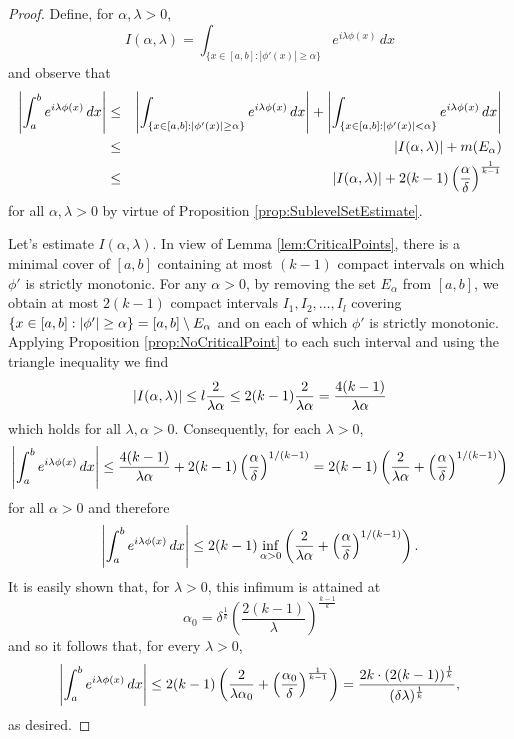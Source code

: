 \documentclass[11pt]{article}
\newcommand{\lp}{\left(}
\newcommand{\rp}{\right)}
\newcommand{\f}[2]{\frac{#1}{#2}}
\newcommand{\al}{\alpha}
\begin{document}
\begin{proof}
Define, for $\alpha,\lambda>0$,
\begin{equation*}
    I(\alpha,\lambda)=\int_{\{x\in[a,b]:|\phi'(x)|\geq \alpha\}}e^{i\lambda\phi(x)}\,dx
\end{equation*}
and observe that
\begin{eqnarray*}
    \abs{\int_a^b e^{i\lambda \phi(x)} \,dx}
    &\leq&  \abs{\int_{\{x\in[a,b]:|\phi'(x)|\geq \alpha\}}e^{i\lambda\phi(x)}\,dx}
    + 
    \abs{\int_{\{ x\in [a,b]: \abs{\phi'(x)} < \al \}}e^{i\lambda \phi(x)} \,dx } \\
    &\leq& \abs{I(\alpha,\lambda)}  + m(E_\al)\\
    &\leq& \abs{I(\alpha,\lambda)} + 2(k-1)\lp\f{\al}{\delta}\rp^{\f{1}{k-1}}
\end{eqnarray*}
for all $\alpha,\lambda>0$ by virtue of Proposition \ref{prop:SublevelSetEstimate}. 

Let's estimate $I(\al,\lambda)$. In view of Lemma \ref{lem:CriticalPoints}, there is a minimal cover of $[a,b]$ containing at most $(k-1)$ compact intervals on which $\phi'$ is strictly monotonic. For any $\alpha>0$, by removing the set $E_\alpha$ from $[a,b]$, we obtain at most $2(k-1)$ compact intervals $I_1,I_2,\dots,I_l$ covering $\{ x\in [a,b] : \abs{\phi'} \geq\alpha \}=[a,b]\setminus E_\alpha$ and on each of which $\phi'$ is strictly monotonic. Applying Proposition \ref{prop:NoCriticalPoint} to each such interval and using the triangle inequality we find 
\begin{equation*}
    \abs{I(\alpha,\lambda)} \leq l\f{2}{\lambda\alpha} \leq 2(k-1)\frac{2}{\lambda\alpha}= \f{4(k-1)}{\lambda\alpha}
\end{equation*}
which holds for all $\lambda,\alpha>0$. Consequently, for each $\lambda>0$,
\begin{equation*}
    \abs{\int_a^be^{i\lambda\phi(x)}\,dx}\leq \frac{4(k-1)}{\lambda \alpha}+2(k-1)\left(\frac{\alpha}{\delta}\right)^{1/(k-1)}=2(k-1)\left(\frac{2}{\lambda\alpha}+\left(\frac{\alpha}{\delta}\right)^{1/(k-1)}\right)
\end{equation*}
for all $\alpha>0$ and therefore
\begin{equation*}
    \abs{\int_a^b e^{i\lambda\phi(x)}\,dx}\leq 2(k-1)\inf_{\alpha>0}\left(\frac{2}{\lambda\alpha}+\left(\frac{\alpha}{\delta}\right)^{1/(k-1)}\right).
\end{equation*}
It is easily shown that, for $\lambda>0$, this infimum is attained at
\begin{equation*}
    \al_0 = \delta^{\f{1}{k}} \left( \f{2(k-1)}{\lambda} \right)^{\f{k-1}{k}}
\end{equation*}
and so it follows that, for every $\lambda>0$,
\begin{equation*}
    \abs{\int_a^b e^{i\lambda \phi(x)} \,dx} \leq 2(k-1)\left( \f{2}{\lambda \alpha_0} +\left(  \f{\al_0}{\delta}\right)^{\f{1}{k-1}}   \right)=\f{2k\cdot (2(k-1))^{\f{1}{k}}}{(\delta\lambda)^{\f{1}{k}}},
\end{equation*}
as desired.


\end{proof}
\end{document}
